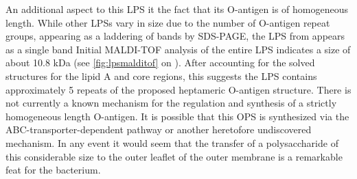 	An additional aspect to this \ac{LPS} it the fact that its O-antigen is of homogeneous length. While other \ac{LPS}s vary in size due to the number of O-antigen repeat groups, appearing as a laddering of bands by \ac{SDS-PAGE}, the \ac{LPS} from \caulobacter appears as a single band Initial \ac{MALDI-TOF} analysis of the entire \ac{LPS} indicates a size of about 10.8 kDa (see \cref{fig:lpsmalditof} on ).
	After accounting for the solved structures for the lipid A and core regions, this suggests the \ac{LPS} contains approximately 5 repeats of the proposed heptameric O-antigen structure.  There is not currently a known mechanism for the regulation and synthesis of a strictly homogeneous length O-antigen. It is possible that this \ac{OPS} is synthesized via the \ac{ABC}-transporter-dependent pathway or another heretofore undiscovered mechanism. In any event it would seem that the transfer of a polysaccharide of this considerable size to the outer leaflet of the outer membrane is a remarkable feat for the bacterium.
 
